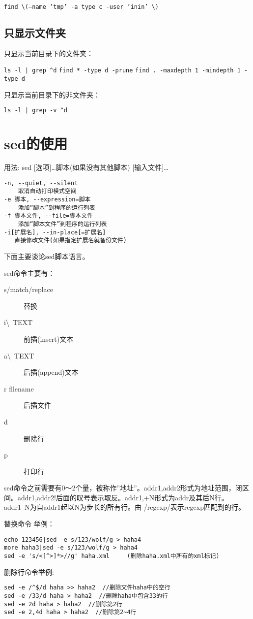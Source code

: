 \verb+find \(–name ’tmp’ -a type c -user ’inin’ \)+


\subsection{只显示文件夹}
只显示当前目录下的文件夹：

\verb+ls -l | grep ^d+
\verb+find * -type d -prune+
\verb+find . -maxdepth 1 -mindepth 1 -type d+

只显示当前目录下的非文件夹：

\verb+ls -l | grep -v ^d+

\section{sed的使用}

用法: sed [选项]\ldots {脚本(如果没有其他脚本)} [输入文件]\ldots

\begin{verbatim}
-n, --quiet, --silent
    取消自动打印模式空间
-e 脚本, --expression=脚本
    添加“脚本”到程序的运行列表
-f 脚本文件, --file=脚本文件
    添加“脚本文件”到程序的运行列表
-i[扩展名], --in-place[=扩展名]
   直接修改文件(如果指定扩展名就备份文件)
\end{verbatim}

下面主要谈论sed脚本语言。


sed命令主要有：
\begin{description}
    \item[s/match/replace]替换
    \item[i\textbackslash\ TEXT]前插(insert)文本
    \item[a\textbackslash\ TEXT]后插(append)文本
    \item[r filename]后插文件
    \item[d]删除行
    \item[p]打印行
\end{description}

sed命令之前需要有0～2个量，被称作''地址''。addr1,addr2形式为地址范围，闭区间。addr1,addr2!后面的叹号表示取反。addr1,+N形式为addr及其后N行。addr1~N为自addr1起以N为步长的所有行。由 /regexp/表示regexp匹配到的行。

替换命令 举例：
\begin{verbatim}
echo 123456|sed -e s/123/wolf/g > haha4
more haha3|sed -e s/123/wolf/g > haha4
sed -e 's/<[^>]*>//g' haha.xml     (删除haha.xml中所有的xml标记)
\end{verbatim}

删除行命令举例:
\begin{verbatim}
sed -e /^$/d haha >> haha2  //删除文件haha中的空行
sed -e /33/d haha > haha2  //删除haha中包含33的行
sed -e 2d haha > haha2  //删除第2行
sed -e 2,4d haha > haha2  //删除第2~4行
\end{verbatim}

